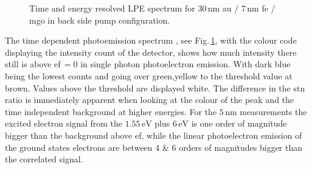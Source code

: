 \documentclass[a4paper,12pt,twoside]{article}
\begin{document}
	\begin{figure}[H]
		\caption{Time and energy resolved LPE spectrum for $30\,\mathrm{nm}$ \gls{au} / $7\,\mathrm{nm}$ \gls{fe} / \gls{mgo} in back side pump configuration.}
	    	\label{BP30nonorm}
	\end{figure}
 The time dependent photoemission spectrum , see Fig.\,\ref{BP30nonorm}, with the colour code displaying the intensity count of the detector, shows how much intensity there still is above \gls{ef}$\,= 0$ in single photon photoelectron emission. With dark blue being the lowest counts and going over green,yellow to the threshold value at brown. Values above the threshold are displayed white.
The difference in the \gls{stn} ratio is immediately apparent when looking at the colour of the peak and the time independent background at higher energies.
For the $5\,\mathrm{\mbox{nm}}$ measurements the excited electron signal from the $1.55\,\mathrm{\mbox{eV}}$ plus $6\,\mathrm{\mbox{eV}}$ is one order of magnitude bigger than the background above \gls{ef}, while the linear photoelectron emission of the ground states electrons are between 4 \& 6 orders of magnitudes bigger than the correlated signal.
\newpage
\end{document}

